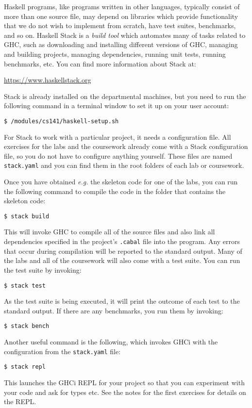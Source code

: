 Haskell programs, like programs written in other languages, typically consist of more than one source file, may depend on libraries which provide functionality that we do not wish to implement from scratch, have test suites, benchmarks, and so on. Haskell Stack is a \emph{build tool} which automates many of tasks related to GHC, such as downloading and installing different versions of GHC, managing and building projects, managing dependencies, running unit tests, running benchmarks, etc. You can find more information about Stack at:
\begin{center}
	\url{https://www.haskellstack.org}
\end{center}
Stack is already installed on the departmental machines, but you need to run the following command in a terminal window to set it up on your user account:
\begin{verbatim}
$ /modules/cs141/haskell-setup.sh
\end{verbatim}
For Stack to work with a particular project, it needs a configuration file. All exercises for the labs and the coursework already come with a Stack configuration file, so you do not have to configure anything yourself. These files are named \texttt{\small stack.yaml} and you can find them in the root folders of each lab or coursework.

Once you have obtained \emph{e.g.} the skeleton code for one of the labs, you can run the following command to compile the code in the folder that contains the skeleton code:
\begin{verbatim}
$ stack build
\end{verbatim}
This will invoke GHC to compile all of the source files and also link all dependencies specified in the project's \texttt{\small .cabal} file into the program. Any errors that occur during compilation will be reported to the standard output. Many of the labs and all of the coursework will also come with a test suite. You can run the test suite by invoking:
\begin{verbatim}
$ stack test
\end{verbatim}
As the test suite is being executed, it will print the outcome of each test to the standard output. If there are any benchmarks, you run them by invoking:
\begin{verbatim}
$ stack bench
\end{verbatim}
Another useful command is the following, which invokes GHCi with the configuration from the \texttt{\small stack.yaml} file:
\begin{verbatim}
$ stack repl
\end{verbatim}
This launches the GHCi REPL for your project so that you can experiment with your code and ask for types etc. See the notes for the first exercises for details on the REPL.

